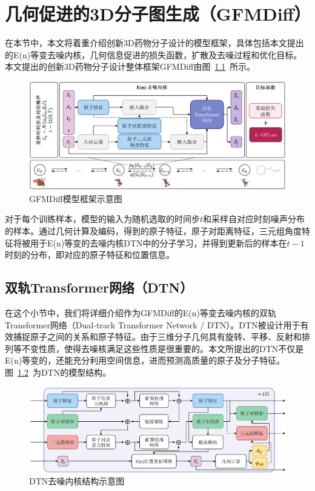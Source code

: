 \chapter{几何促进的3D分子图生成（GFMDiff）}
\label{chap:gfmdiff}

在本节中，本文将着重介绍创新3D药物分子设计的模型框架，具体包括本文提出的E(n)等变去噪内核，几何信息促进的损失函数，扩散及去噪过程和优化目标。本文提出的创新3D药物分子设计整体框架GFMDiff由图~\ref{fig:gfmdiff}~所示。

\begin{figure}[h]
    \centering
    \includegraphics[width=\linewidth]{figures/overview_gfmdiff.png}
    \caption{GFMDiff模型框架示意图}
    \label{fig:gfmdiff}
\end{figure} 

对于每个训练样本，模型的输入为随机选取的时间步$t$和采样自对应时刻噪声分布的样本。通过几何计算及编码，得到的原子特征，原子对距离特征，三元组角度特征将被用于E(n)等变的去噪内核DTN中的分子学习，并得到更新后的样本在$t-1$时刻的分布，即对应的原子特征和位置信息。

\section{双轨Transformer网络（DTN）}
在这个小节中，我们将详细介绍作为GFMDiff的E(n)等变去噪内核的双轨Transformer网络（Dual-track Transformer Network / DTN）。DTN被设计用于有效捕捉原子之间的关系和原子特征。由于三维分子几何具有旋转、平移、反射和排列等不变性质，使得去噪核满足这些性质是很重要的。本文所提出的DTN不仅是E(n)等变的，还能充分利用空间信息，进而预测高质量的原子及分子特征。图~\ref{fig:dtn}~为DTN的模型结构。

\begin{figure}[h]
  \centering
  \includegraphics[width=\linewidth]{figures/structure_dtn.png}
  \caption{DTN去噪内核结构示意图}
  \label{fig:dtn}
\end{figure}

